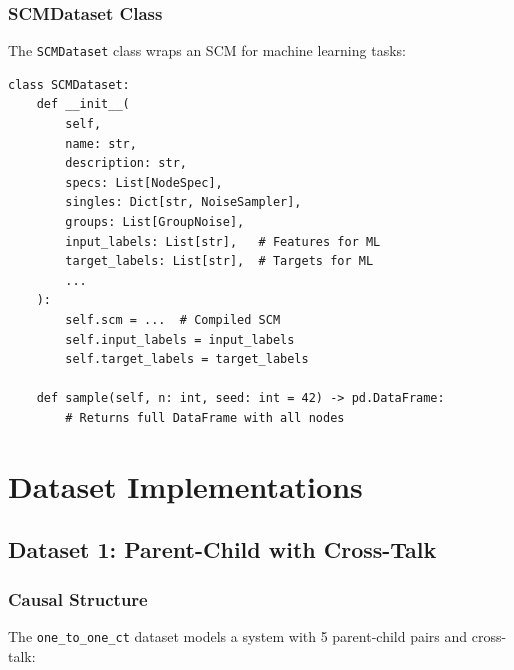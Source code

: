 \documentclass[11pt,a4paper]{article}
\begin{document}
\subsubsection{SCMDataset Class}

The \texttt{SCMDataset} class wraps an SCM for machine learning tasks:

\begin{lstlisting}[caption={SCMDataset Interface}]
class SCMDataset:
    def __init__(
        self,
        name: str,
        description: str,
        specs: List[NodeSpec],
        singles: Dict[str, NoiseSampler],
        groups: List[GroupNoise],
        input_labels: List[str],   # Features for ML
        target_labels: List[str],  # Targets for ML
        ...
    ):
        self.scm = ...  # Compiled SCM
        self.input_labels = input_labels
        self.target_labels = target_labels

    def sample(self, n: int, seed: int = 42) -> pd.DataFrame:
        # Returns full DataFrame with all nodes
\end{lstlisting}

\section{Dataset Implementations}

\subsection{Dataset 1: Parent-Child with Cross-Talk}

\subsubsection{Causal Structure}

The \texttt{one\_to\_one\_ct} dataset models a system with 5 parent-child pairs and cross-talk:
\end{document}
